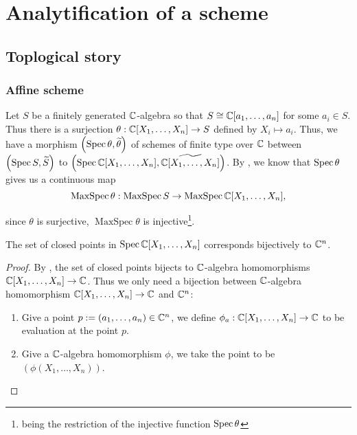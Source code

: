 \chapter{Analytification of a scheme}


\section{Toplogical story}


\subsection{Affine scheme}



Let $S$ be a finitely generated $\mathbb{C}$-algebra so that $S \cong \mathbb{C}[a_{1},\dots, a_{n}]$ for some $a_{i} \in S$. Thus there is a surjection $\theta: \mathbb{C}[X_{1}, \dots, X_{n}] \to S$ defined by $X_{i} \mapsto a_{i}$. Thus, we have a morphism $\left(\operatorname*{Spec}{\theta}, \widetilde{\theta}\right)$ of schemes of finite type over $\mathbb{C}$ between $\left(\operatorname*{Spec}{S}, \widetilde{S}\right)$ to $\left(\operatorname*{Spec}{\mathbb{C}[X_{1},\dots, X_{n}]}, \widetilde{\mathbb{C}[X_{1},\dots, X_{n}]}\right)$. By , we know that $\operatorname{Spec}\theta$ gives us a continuous map
\[
	\operatorname{MaxSpec}\theta: \operatorname{MaxSpec} S \to \operatorname{MaxSpec} \mathbb{C}[X_{1},\dots, X_{n}],
\]

since $\theta$ is surjective, $\operatorname{MaxSpec}\theta$ is injective\footnote{being the restriction of the injective function $\operatorname{Spec} \theta$}.

\begin{theorem}
	The set of closed points in $\operatorname{Spec}{\mathbb{C}[X_{1},\dots, X_{n}]}$ corresponds bijectively to $\mathbb{C}^{n}$.

\end{theorem}
\begin{proof}
	By , the set of closed points
	bijects to $\mathbb{C}$-algebra homomorphisms $\mathbb{C}[X_{1}, \dots, X_{n}] \to \mathbb{C}$. Thus we only need a bijection between $\mathbb{C}$-algebra homomorphism $\mathbb{C}[X_{1}, \dots, X_{n}] \to \mathbb{C}$ and $\mathbb{C}^{n}$:
	\begin{enumerate}
		\item Give a point $p := (a_{1},\dots, a_{n}) \in \mathbb{C}^{n}$, we define $\phi_{a}: \mathbb{C}[X_{1},\dots, X_{n}] \to \mathbb{C}$ to be evaluation at the point $p$.

		\item Give a $\mathbb{C}$-algebra homomorphism $\phi$, we take the point to be $(\phi(X_{1}, \dots, X_{n}))$.
	\end{enumerate}
\end{proof}

